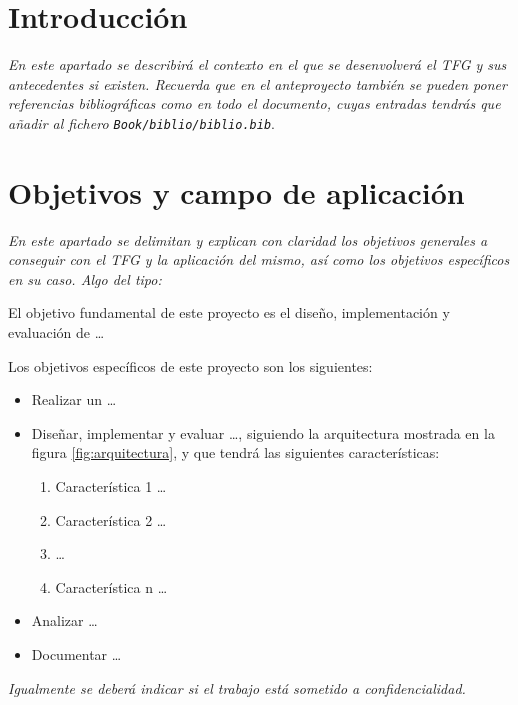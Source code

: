 \documentclass[11pt,a4paper,oneside]{article}
\begin{document}
\section{Introducción}
\label{sec:introduccion}

\textit{En este apartado se describirá el contexto en el que se desenvolverá el
  TFG y sus antecedentes si existen. Recuerda que en el anteproyecto
  también se pueden poner referencias bibliográficas como \cite{moore2002} en todo el documento, cuyas entradas tendrás que añadir al fichero \texttt{Book/biblio/biblio.bib}}.


\section{Objetivos y campo de aplicación}
\label{sec:objetivos-y-campo}

\textit{En este apartado se delimitan y explican con claridad los objetivos
  generales a conseguir con el TFG y la aplicación del mismo, así como los
  objetivos específicos en su caso. Algo del tipo:}

El objetivo fundamental de este proyecto es el diseño, implementación y
evaluación de \ldots

Los objetivos específicos de este proyecto son los siguientes:

\begin{itemize}
\item Realizar un  \ldots
\item Diseñar, implementar y evaluar  \ldots, siguiendo la arquitectura
  mostrada en la figura \ref{fig:arquitectura}, y que tendrá las
  siguientes características:

  \begin{enumerate}
  \item Característica 1 \ldots
  \item Característica 2 \ldots
  \item  \ldots
  \item Característica n \ldots
  \end{enumerate}

\item Analizar  \ldots

\item Documentar  \ldots

\end{itemize}

\textit{Igualmente se deberá indicar si el trabajo está sometido a confidencialidad.}
\end{document}

